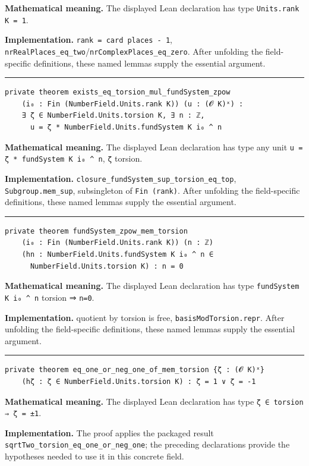 \documentclass[UTF8,a4paper,11pt,fontset=fandol]{ctexart}
\theoremstyle{definition}
\newcommand{\statementsep}{\par\medskip\hrule\medskip}
\begin{document}
\noindent\textbf{Mathematical meaning.} The displayed Lean declaration has type \texttt{Units.\allowbreak{}rank K = 1}.\par
\noindent\textbf{Implementation.} \texttt{rank = card places - 1}, \texttt{nrRealPlaces\_\allowbreak{}eq\_\allowbreak{}two}/\texttt{nrComplexPlaces\_\allowbreak{}eq\_\allowbreak{}zero}. After unfolding the field-specific definitions, these named lemmas supply the essential argument.\par
\statementsep
\begin{verbatim}
private theorem exists_eq_torsion_mul_fundSystem_zpow
    (i₀ : Fin (NumberField.Units.rank K)) (u : (𝓞 K)ˣ) :
    ∃ ζ ∈ NumberField.Units.torsion K, ∃ n : ℤ,
      u = ζ * NumberField.Units.fundSystem K i₀ ^ n
\end{verbatim}
\noindent\textbf{Mathematical meaning.} The displayed Lean declaration has type any unit \texttt{u = ζ * fundSystem K i₀ \textasciicircum{} n}, \texttt{ζ} torsion.\par
\noindent\textbf{Implementation.} \texttt{closure\_\allowbreak{}fundSystem\_\allowbreak{}sup\_\allowbreak{}torsion\_\allowbreak{}eq\_\allowbreak{}top}, \texttt{Subgroup.\allowbreak{}mem\_\allowbreak{}sup}, subsingleton of \texttt{Fin (rank)}. After unfolding the field-specific definitions, these named lemmas supply the essential argument.\par
\statementsep
\begin{verbatim}
private theorem fundSystem_zpow_mem_torsion
    (i₀ : Fin (NumberField.Units.rank K)) (n : ℤ)
    (hn : NumberField.Units.fundSystem K i₀ ^ n ∈
      NumberField.Units.torsion K) : n = 0
\end{verbatim}
\noindent\textbf{Mathematical meaning.} The displayed Lean declaration has type \texttt{fundSystem K i₀ \textasciicircum{} n} torsion ⇒ \texttt{n=0}.\par
\noindent\textbf{Implementation.} quotient by torsion is free, \texttt{basisModTorsion.\allowbreak{}repr}. After unfolding the field-specific definitions, these named lemmas supply the essential argument.\par
\statementsep
\begin{verbatim}
private theorem eq_one_or_neg_one_of_mem_torsion {ζ : (𝓞 K)ˣ}
    (hζ : ζ ∈ NumberField.Units.torsion K) : ζ = 1 ∨ ζ = -1
\end{verbatim}
\noindent\textbf{Mathematical meaning.} The displayed Lean declaration has type \texttt{ζ ∈ torsion ⇒ ζ = ±1}.\par
\noindent\textbf{Implementation.} The proof applies the packaged result \texttt{sqrtTwo\_\allowbreak{}torsion\_\allowbreak{}eq\_\allowbreak{}one\_\allowbreak{}or\_\allowbreak{}neg\_\allowbreak{}one}; the preceding declarations provide the hypotheses needed to use it in this concrete field.\par
\end{document}
